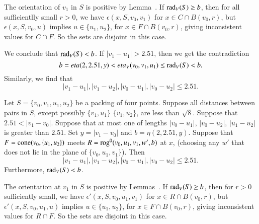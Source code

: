 \begin{tarskidata}
\begin{tarski}
\begin{proved}  
The orientation
of $v_1$ in $S$ is positive by Lemma~.
 If $\operatorname{rad}_V(S)\ge b$, then for all sufficientlly small $r>0$, we have
$\epsilon(x,S,v_0,v_1)$ for $x\in C\cap B(v_0,r)$, 
but $\epsilon(x,S,v_0,u)$ implies $u\in\{u_1,u_2\}$,
for $x\in F\cap B(v_0,r)$, giving inconsistent values for $C\cap F$.  So
the sets are disjoint in this case.  

We conclude that $\operatorname{rad}_V(S) < b$.
If $|v_1-u_1| > 2.51$, then we get the contradiction
$$b = eta(2,2.51,y) < eta_V(v_0,v_1,u_1)\le \operatorname{rad}_V(S) < b.$$
Similarly, we find that
   $$
   |v_1-u_1|,|v_1-u_2|,|v_0-u_1|,|v_0-u_2| \le 2.51.
   $$
\swallowed\end{proved}
\end{tarski}





\begin{tarski}

\begin{lemma}
 Let $S=\{v_0,v_1,u_1,u_2\}$ be a packing of four points.
Suppose all distances between pairs in $S$, except possibly $\{v_1,u_1\}$
$\{v_1,u_2\}$, are
less than $\sqrt8$.
Suppose that $2.51 < |v_1-v_0|$.
Suppose that at most one of lengths $|v_0-u_1|$,
$|v_0-u_2|$, $|u_1-u_2|$ is greater than $2.51$.
%
Set $y=|v_1-v_0|$ and $b=\eta(2,2.51,y)$.
Suppose that $F={\operatorname{cone}}(v_0,\{u_1,u_2\})$ meets
$R={\operatorname{rog}}^0(v_0,u_1,v_1,w',b)$ at $x$, (choosing any $w'$ that
does not lie in the plane of $\{v_0,u_1,v_1\}$).
Then 
  $$
  |v_1-u_1|,|v_1-u_2|,|v_0-u_1|,|v_0-u_2|\le 2.51.
  $$
Furthermore, $\operatorname{rad}_V(S) < b$. 
\end{lemma}

\begin{proved}  
The orientation
at $v_1$ in $S$ is positive by Lemmas~.
If $\operatorname{rad}_V(S)\ge b$, then for $r>0$ sufficiently small, we have
$\epsilon'(x,S,v_0,u_1,v_1)$ for $x\in R\cap B(v_0,r)$, 
but $\epsilon'(x,S,v_0,u_1,u)$ implies $u\in\{u_1,u_2\}$,
for $x\in F\cap B(v_0,r)$, giving inconsistent values for $R\cap F$.  So
the sets are disjoint in this case.  


\end{proved}
\end{tarski}
\end{tarskidata}
